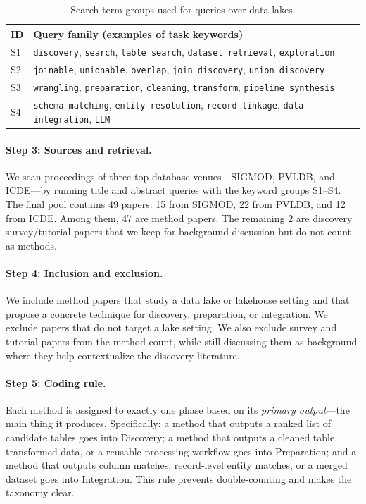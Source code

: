 \documentclass[sigconf]{acmart}
\newcommand{\tbl}{%
  \scriptsize
  \setlength{\tabcolsep}{4pt}%
  \renewcommand{\arraystretch}{1.12}%
}
\begin{document}
\begin{table}[!htbp]
\caption{Search term groups used for queries over data lakes.}
\label{tab:search-strings}
\centering
\tbl
\begin{tabularx}{\columnwidth}{@{}p{8mm}X@{}}
\toprule
\textbf{ID} & \textbf{Query family (examples of task keywords)} \\
\midrule
S1 & \texttt{discovery}, \texttt{search}, \texttt{table search}, \texttt{dataset retrieval}, \texttt{exploration} \\
S2 & \texttt{joinable}, \texttt{unionable}, \texttt{overlap}, \texttt{join discovery}, \texttt{union discovery} \\
S3 & \texttt{wrangling}, \texttt{preparation}, \texttt{cleaning}, \texttt{transform}, \texttt{pipeline synthesis} \\
S4 & \texttt{schema matching}, \texttt{entity resolution}, \texttt{record linkage}, \texttt{data integration}, \texttt{LLM} \\
\bottomrule
\end{tabularx}
\end{table}

\paragraph{Step 3: Sources and retrieval.}
We scan proceedings of three top database venues---SIGMOD, PVLDB, and ICDE---by running title and abstract queries with the keyword groups S1--S4.
The final pool contains 49 papers: 15 from SIGMOD, 22 from PVLDB, and 12 from ICDE. Among them, 47 are method papers. The remaining 2 are discovery survey/tutorial papers that we keep for background discussion but do not count as methods.

\paragraph{Step 4: Inclusion and exclusion.}
We include method papers that study a data lake or lakehouse setting and that propose a concrete technique for discovery, preparation, or integration. We exclude papers that do not target a lake setting. We also exclude survey and tutorial papers from the method count, while still discussing them as background where they help contextualize the discovery literature.

\paragraph{Step 5: Coding rule.}
Each method is assigned to exactly one phase based on its \emph{primary output}---the main thing it produces. Specifically: a method that outputs a ranked list of candidate tables goes into Discovery; a method that outputs a cleaned table, transformed data, or a reusable processing workflow goes into Preparation; and a method that outputs column matches, record-level entity matches, or a merged dataset goes into Integration. This rule prevents double-counting and makes the taxonomy clear.
\end{document}
